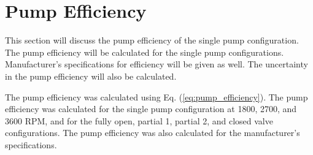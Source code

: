 \section{Pump Efficiency}
\label{sec:pump_efficiency}
This section will discuss the pump efficiency of the single pump configuration. The pump efficiency will be calculated for the single pump configurations. Manufacturer's specifications for efficiency will be given as well. The uncertainty in the pump efficiency will also be calculated.

The pump efficiency was calculated using Eq. (\ref{eq:pump_efficiency}). The pump efficiency was calculated for the single pump configuration at 1800, 2700, and 3600 RPM, and for the fully open, partial 1, partial 2, and closed valve configurations. The pump efficiency was also calculated for the manufacturer's specifications. 
